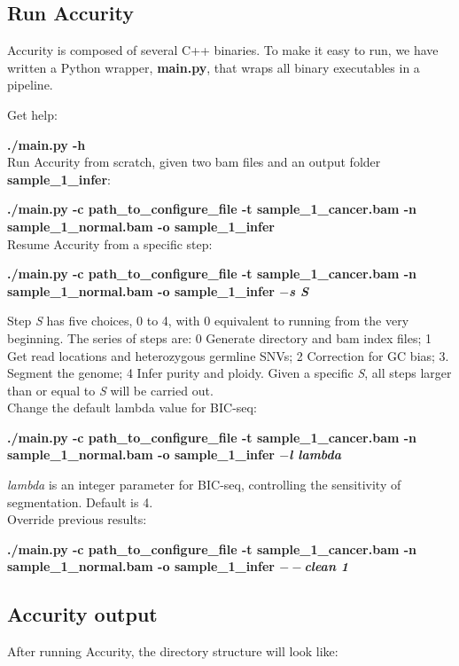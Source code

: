 \documentclass{article}
\begin{document}
\subsection{Run Accurity}
Accurity is composed of several C++ binaries. To make it easy to run, we have written a Python wrapper, \textbf{main.py}, that wraps all binary executables in a pipeline.


Get help:

\textbf{./main.py -h} \\

Run Accurity from scratch, given two bam files and an output folder \textbf{sample\_1\_infer}:

\textbf{./main.py -c path\_to\_configure\_file -t sample\_1\_cancer.bam -n sample\_1\_normal.bam -o sample\_1\_infer }\\

Resume Accurity from a specific step:

\textbf{./main.py -c path\_to\_configure\_file -t sample\_1\_cancer.bam -n sample\_1\_normal.bam -o sample\_1\_infer \textit{ $-$s S}}

Step \textit{ S} has five choices, 0 to 4, with 0 equivalent to running from the very beginning. The series of steps are: 0 Generate directory and bam index files; 1 Get read locations and heterozygous germline SNVs; 2 Correction for GC bias; 3. Segment the genome; 4 Infer purity and ploidy. Given a specific \textit{ S},  all steps larger than or equal to \textit{ S} will be carried out.\\

Change the default lambda value for BIC-seq:

\textbf{./main.py -c path\_to\_configure\_file -t sample\_1\_cancer.bam -n sample\_1\_normal.bam -o sample\_1\_infer  \textit{ $-$l lambda}}

\textit{ lambda} is an integer parameter for BIC-seq, controlling the sensitivity of segmentation. Default is 4.\\

Override previous results:

\textbf{./main.py -c path\_to\_configure\_file -t sample\_1\_cancer.bam -n sample\_1\_normal.bam -o sample\_1\_infer \textit{ $--$clean 1}}

\subsection{Accurity output}
After running Accurity, the directory structure will look like:\\
\end{document}
